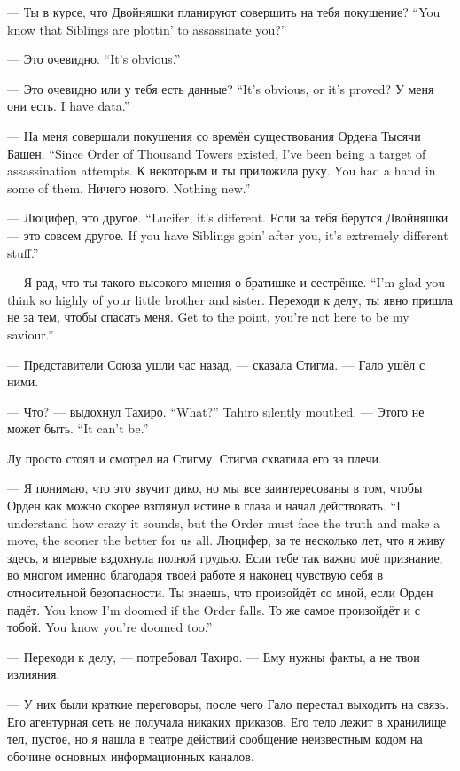 {--- Ты в курсе, что Двойняшки планируют совершить на тебя покушение?}
{``You know that Siblings are plottin' to assassinate you?''}

{--- Это очевидно.}
{``It's obvious.''}

{--- Это очевидно или у тебя есть данные?}
{``It's obvious, or it's proved?}
{У меня они есть.}
{I have data.''}

{--- На меня совершали покушения со времён существования Ордена Тысячи Башен.}
{``Since Order of Thousand Towers existed, I've been being a target of assassination attempts.}
{К некоторым и ты приложила руку.}
{You had a hand in some of them.}
{Ничего нового.}
{Nothing new.''}

{--- Люцифер, это другое.}
{``Lucifer, it's different.}
{Если за тебя берутся Двойняшки --- это совсем другое.}
{If you have Siblings goin' after you, it's extremely different stuff.''}

{--- Я рад, что ты такого высокого мнения о братишке и сестрёнке.}
{``I'm glad you think so highly of your little brother and sister.}
{Переходи к делу, ты явно пришла не за тем, чтобы спасать меня.}
{Get to the point, you're not here to be my saviour.''}

--- Представители Союза ушли час назад, --- сказала Стигма.
--- Гало ушёл с ними.

{--- Что? --- выдохнул Тахиро.}
{``What?'' Tahiro silently mouthed.}
{--- Этого не может быть.}
{``It can't be.''}

Лу просто стоял и смотрел на Стигму.
Стигма схватила его за плечи.

{--- Я понимаю, что это звучит дико, но мы все заинтересованы в том, чтобы Орден как можно скорее взглянул истине в глаза и начал действовать.}
{``I understand how crazy it sounds, but the Order must face the truth and make a move, the sooner the better for us all.}
Люцифер, за те несколько лет, что я живу здесь, я впервые вздохнула полной грудью.
Если тебе так важно моё признание, во многом именно благодаря твоей работе я наконец чувствую себя в относительной безопасности.
{Ты знаешь, что произойдёт со мной, если Орден падёт.}
{You know I'm doomed if the Order falls.}
{То же самое произойдёт и с тобой.}
{You know you're doomed too.''}

--- Переходи к делу, --- потребовал Тахиро.
--- Ему нужны факты, а не твои излияния.

--- У них были краткие переговоры, после чего Гало перестал выходить на связь.
Его агентурная сеть не получала никаких приказов.
Его тело лежит в хранилище тел, пустое, но я нашла в театре действий сообщение неизвестным кодом на обочине основных информационных каналов.

